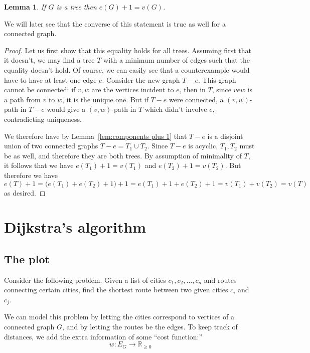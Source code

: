 \documentclass[12pt]{report}
\theoremstyle{plain}
\newtheorem{lem}[thm]{Lemma}
\begin{document}
\begin{lem} \label{tree count lem}
If $G$ is a tree then $e(G) + 1 = v(G)$.
\end{lem}
We will later see that the converse of this statement is true as well for a
connected graph.
\begin{proof}
Let us first show that this equality holds for all trees. Assuming first
that it doesn't, we may find a tree $T$ with a minimum number of edges such
that the equality doesn't hold. Of course, we can easily see that a
counterexample would have to have at least one edge $e$. Consider the new
graph $T - e$. This graph cannot be connected: if $v, w$ are the vertices
incident to $e$, then in $T$, since $v e w$ is a path from $v$ to $w$, it
is the unique one. But if $T -  e$ were connected, a $(v, w)$-path in $T -
e$ would give a $(v, w)$-path in $T$ which didn't involve $e$,
contradicting uniqueness.

We therefore have by Lemma~\ref{lem:components plus 1} that $T - e$ is a
disjoint union of two connected graphs $T - e = T_1 \cup T_2$. Since $T -
e$ is acyclic, $T_1, T_2$ must be as well, and therefore they are both
trees. By assumption of minimality of $T$, it follows that we have $e(T_1)
+ 1 = v(T_1)$ and $e(T_2) + 1 = v(T_2)$. But therefore we have
\[ e(T) + 1 = \big(e(T_1) + e(T_2) + 1\big) + 1 = e(T_1) + 1 + e(T_2) +
1 = v(T_1) + v(T_2) = v(T) \]
as desired.
\end{proof}

\section{Dijkstra's algorithm}

\subsection{The plot}

Consider the following problem. Given a list of cities $c_1, c_2, \ldots,
c_n$ and routes connecting certain cities, find the shortest route between
two given cities $c_i$ and $c_j$.

We can model this problem by letting the cities correspond to vertices of a
connected graph $G$, and by letting the routes be the edges. To keep track of
distances, we add the extra information of some ``cost function:''
\[ w: E_G \to \mathbb R_{\geq 0}\]
\end{document}
